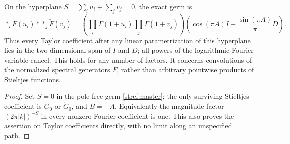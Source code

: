 \begin{corollary}
\label{stref:neutral-many}
On the hyperplane $S=\sum_i u_i+\sum_jv_j=0$, the exact germ is
\begin{equation}\label{stref:neutral-many-eq}
 \mathop{*}_iF(u_i)*\mathop{*}_j\check F(v_j)
 =\left(\prod_i\Gamma(1+u_i)\prod_j\Gamma(1+v_j)\right)
   \left(\cos(\pi A)I+\frac{\sin(\pi A)}\pi D\right).
\end{equation}
Thus every Taylor coefficient after any linear parametrization of this
hyperplane lies in the two-dimensional span of $I$ and $D$; all powers
of the logarithmic Fourier variable cancel. This holds for any number
of factors. It concerns convolutions of the normalized spectral
generators $F$, rather than arbitrary pointwise products of Stieltjes
functions.
\end{corollary}
\begin{proof}
Set $S=0$ in the pole-free germ \eqref{stref:master}; the only surviving
Stieltjes coefficient is $G_0$ or $\check G_0$, and $B=-A$.
Equivalently the magnitude factor $(2\pi|k|)^{-S}$ in every nonzero
Fourier coefficient is one. This also proves the assertion on Taylor
coefficients directly, with no limit along an unspecified path.
\end{proof}

